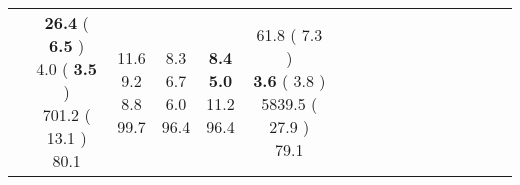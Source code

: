 \documentclass[9pt]{article}
\begin{document}
\begin{landscape}
\begin{longtable}{ l | c c c c | c c c c | c c c c | c c c c |}
 &
                    
                            \makecell{              \textbf{ 26.4 }
     (             \textbf{ 6.5 }
    ) \\
            {\footnotesize             4.0
     (              \textbf{ 3.5 }
     )} \\
            {\footnotesize             701.2
     (            13.1
    ) } \\
            {\small  \textcolor[rgb]{ 0.598 , 0.302 , 0.1} {80.1  }
} }


             &
                            \makecell{              11.6
     \\
            {\footnotesize             9.2
    } \\  {\footnotesize             8.8
     } \\
            {\small \textcolor[rgb]{ 0.206 , 0.695 , 0.1} {99.7  }
} }
             &                         \makecell{              8.3
     \\
            {\footnotesize             6.7
    } \\  {\footnotesize             6.0
     } \\
            {\small \textcolor[rgb]{ 0.272 , 0.628 , 0.1} {96.4  }
} }
             &
                            \makecell{              \textbf{ 8.4 }
     \\
            {\footnotesize             \textbf{ 5.0 }
    } \\  {\footnotesize             11.2
     } \\
            {\small \textcolor[rgb]{ 0.272 , 0.628 , 0.1} {96.4  }
} }
            

 & 
                            \makecell{              61.8
     (             7.3
    ) \\
            {\footnotesize             \textbf{ 3.6 }
     (              3.8
     )} \\
            {\footnotesize             5839.5
     (            27.9
    ) } \\
            {\small  \textcolor[rgb]{ 0.618 , 0.282 , 0.1} {79.1  }
} }



\end{longtable}
\end{landscape}
\end{document}
